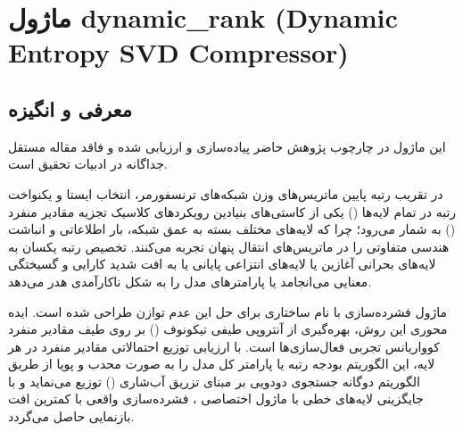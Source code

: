 \section{ماژول dynamic\_rank (Dynamic Entropy SVD Compressor)}
\label{sec:module_dynamic_rank}

\subsection{معرفی و انگیزه}
این ماژول در چارچوب پژوهش حاضر پیاده‌سازی و ارزیابی شده و فاقد مقاله مستقل جداگانه در ادبیات تحقیق است.

در تقریب رتبه پایین ماتریس‌های وزن شبکه‌های ترنسفورمر، انتخاب ایستا و یکنواخت رتبه در تمام لایه‌ها () یکی از کاستی‌های بنیادین رویکردهای کلاسیک تجزیه مقادیر منفرد () به شمار می‌رود؛ چرا که لایه‌های مختلف بسته به عمق شبکه، بار اطلاعاتی و انباشت هندسی متفاوتی را در ماتریس‌های انتقال پنهان تجربه می‌کنند. تخصیص رتبه یکسان به لایه‌های بحرانی آغازین یا لایه‌های انتزاعی پایانی یا به افت شدید کارایی و گسیختگی معنایی می‌انجامد یا پارامترهای مدل را به شکل ناکارآمدی هدر می‌دهد.

ماژول فشرده‌سازی  با نام ساختاری  برای حل این عدم توازن طراحی شده است. ایده محوری این روش، بهره‌گیری از آنتروپی طیفی تیکونوف () بر روی طیف مقادیر منفرد کوواریانس تجربی فعال‌سازی‌ها است. با ارزیابی توزیع احتمالاتی مقادیر منفرد در هر لایه، این الگوریتم بودجه رتبه یا پارامتر کل مدل را به صورت محدب و پویا از طریق الگوریتم دوگانه جستجوی دودویی بر مبنای تزریق آب‌شاری () توزیع می‌نماید و با جایگزینی لایه‌های خطی با ماژول اختصاصی ، فشرده‌سازی واقعی با کمترین افت بازنمایی حاصل می‌گردد.

